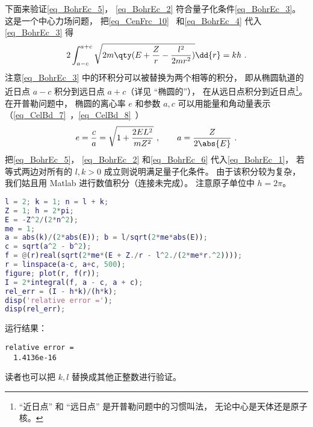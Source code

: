 下面来验证\autoref{eq_BohrEc_5}， \autoref{eq_BohrEc_2} 符合量子化条件\autoref{eq_BohrEc_3}。 这是一个中心力场问题， 把\autoref{eq_CenFrc_10}~ 和\autoref{eq_BohrEc_4}  代入\autoref{eq_BohrEc_3} 得
\begin{equation}\label{eq_BohrEc_1}
2\int_{a-c}^{a+c} \sqrt{2m\qty(E + \frac{Z}{r} - \frac{l^2}{2mr^2})} \dd{r} = kh~.
\end{equation}
注意\autoref{eq_BohrEc_3} 中的环积分可以被替换为两个相等的积分， 即从椭圆轨道的近日点 $a-c$ 积分到远日点 $a+c$（详见 “椭圆的”）， 在从远日点积分到近日点\footnote{“近日点” 和 “远日点” 是开普勒问题中的习惯叫法， 无论中心是天体还是原子核。}。 在开普勒问题中， 椭圆的离心率 $e$ 和参数 $a, c$ 可以用能量和角动量表示（\autoref{eq_CelBd_7}~，\autoref{eq_CelBd_8}~）
\begin{equation}\label{eq_BohrEc_6}
e = \frac{c}{a} = \sqrt{1 + \frac{2EL^2}{mZ^2}}~,
\qquad
a = \frac{Z}{2\abs{E}}~.
\end{equation}
把\autoref{eq_BohrEc_5}， \autoref{eq_BohrEc_2} 和\autoref{eq_BohrEc_6} 代入\autoref{eq_BohrEc_1}， 若等式两边对所有的 $l,k > 0$ 成立则说明满足量子化条件。 由于该积分较为复杂， 我们姑且用 Matlab 进行数值积分（连接未完成）。 注意原子单位中 $h = 2\pi$。
\begin{lstlisting}[language=matlab]
l = 2; k = 1; n = l + k;
Z = 1; h = 2*pi;
E = -Z^2/(2*n^2);
me = 1;
a = abs(k)/(2*abs(E)); b = l/sqrt(2*me*abs(E));
c = sqrt(a^2 - b^2);
f = @(r)real(sqrt(2*me*(E + Z./r - l^2./(2*me*r.^2))));
r = linspace(a-c, a+c, 500);
figure; plot(r, f(r));
I = 2*integral(f, a - c, a + c);
rel_err = (I - h*k)/(h*k);
disp('relative error =');
disp(rel_err);
\end{lstlisting}
运行结果： 
\begin{lstlisting}[language=matlabC]
relative error =
  1.4136e-16
\end{lstlisting}
读者也可以把 $k, l$ 替换成其他正整数进行验证。
